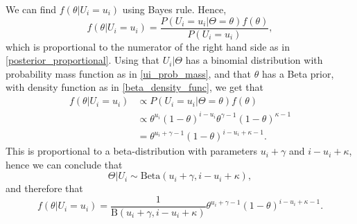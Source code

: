 We can find $f(\theta| U_i=u_i)$ using Bayes rule. Hence,
\begin{equation*}
    f(\theta| U_i=u_i) = \frac{P(U_i=u_i|\Theta=\theta)f(\theta)}{P(U_i=u_i)},
\end{equation*}
which is proportional to the numerator of the right hand side as in \eqref{posterior_proportional}. Using that $U_i|\Theta$ has a binomial distribution with probability mass function as in \eqref{ui_prob_mass}, and that $\theta$ has a Beta prior, with density function as in \eqref{beta_density_func}, we get that
\begin{equation*}
    \begin{aligned}
        f(\theta|U_i=u_i) 
        &\propto P(U_i=u_i|\Theta=\theta)f(\theta)\\[6pt] 
        &\propto \theta^{u_i}(1-\theta)^{i-u_i}\theta^{\gamma-1}(1-\theta)^{\kappa-1}\\[6pt]
        &= \theta^{u_i+\gamma-1}(1-\theta)^{i-u_i+\kappa-1}.
    \end{aligned}
\end{equation*}
This is proportional to a beta-distribution with parameters $u_i+\gamma$ and $i-u_i+\kappa$, hence we can conclude that
\begin{equation*}
    \Theta|U_i \sim \text{Beta}(u_i+\gamma,i-u_i+\kappa),
\end{equation*}
and therefore that 
\begin{equation}
\label{theta_given_ui}
    f(\theta|U_i=u_i) = \frac{1}{\text{B}(u_i+\gamma,i-u_i+\kappa)}\theta^{u_i+\gamma-1}(1-\theta)^{i-u_i+\kappa-1}.
\end{equation}

